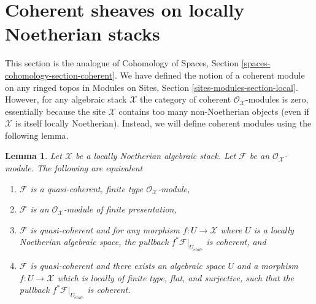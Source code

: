 \documentclass{stacks-project}
\theoremstyle{plain}
\newtheorem{lemma}[subsection]{Lemma}
\theoremstyle{definition}
\theoremstyle{remark}
\numberwithin{equation}{subsection}
\def\etale{{\acute{e}tale}}
\begin{document}
\section{Coherent sheaves on locally Noetherian stacks}
\label{section-coherent-sheaves}

\noindent
This section is the analogue of
Cohomology of Spaces, Section
\ref{spaces-cohomology-section-coherent}.
We have defined the notion of a coherent module on any ringed topos in
Modules on Sites, Section \ref{sites-modules-section-local}.
However, for any algebraic stack $\mathcal{X}$ the category of
coherent $\mathcal{O}_\mathcal{X}$-modules is zero, essentially because
the site $\mathcal{X}$ contains too many non-Noetherian objects (even
if $\mathcal{X}$ is itself locally Noetherian). Instead, we will define
coherent modules using the following lemma.

\begin{lemma}
\label{lemma-coherent-Noetherian}
Let $\mathcal{X}$ be a locally Noetherian algebraic stack.
Let $\mathcal{F}$ be an $\mathcal{O}_\mathcal{X}$-module.
The following are equivalent
\begin{enumerate}
\item $\mathcal{F}$ is a quasi-coherent, finite type
$\mathcal{O}_\mathcal{X}$-module,
\item $\mathcal{F}$ is an $\mathcal{O}_\mathcal{X}$-module
of finite presentation,
\item $\mathcal{F}$ is quasi-coherent and for any morphism
$f : U \to \mathcal{X}$ where $U$ is a locally Noetherian algebraic space,
the pullback $f^*\mathcal{F}|_{U_\etale}$ is coherent, and
\item $\mathcal{F}$ is quasi-coherent and there exists an algebraic space
$U$ and a morphism $f : U \to \mathcal{X}$ which is locally of finite type,
flat, and surjective, such that the pullback $f^*\mathcal{F}|_{U_\etale}$
is coherent.
\end{enumerate}
\end{lemma}
\end{document}
